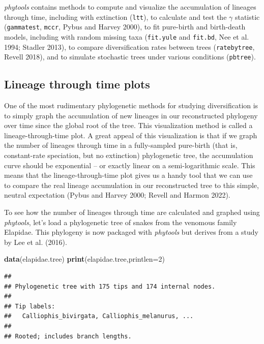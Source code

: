 \documentclass[fleqn,10pt,lineno]{wlpeerj} %
\newenvironment{Shaded}{\begin{snugshade}}{\end{snugshade}}
\newcommand{\AttributeTok}[1]{\textcolor[rgb]{0.13,0.29,0.53}{#1}}
\newcommand{\DecValTok}[1]{\textcolor[rgb]{0.00,0.00,0.81}{#1}}
\newcommand{\FunctionTok}[1]{\textcolor[rgb]{0.13,0.29,0.53}{\textbf{#1}}}
\newcommand{\NormalTok}[1]{#1}
\begin{document}
\emph{phytools} contains methods to compute and visualize the accumulation of lineages through time, including with extinction (\texttt{ltt}), to calculate and test the \(\gamma\) statistic (\texttt{gammatest}, \texttt{mccr}, Pybus and Harvey 2000), to fit pure-birth and birth-death models, including with random missing taxa (\texttt{fit.yule} and \texttt{fit.bd}, Nee et al. 1994; Stadler 2013), to compare diversification rates between trees (\texttt{ratebytree}, Revell 2018), and to simulate stochastic trees under various conditions (\texttt{pbtree}).

\hypertarget{lineage-through-time-plots}{%
\subsection{Lineage through time plots}\label{lineage-through-time-plots}}

One of the most rudimentary phylogenetic methods for studying diversification is to simply graph the accumulation of new lineages in our reconstructed phylogeny over time since the global root of the tree. This visualization method is called a lineage-through-time plot. A great appeal of this visualization is that if we graph the number of lineages through time in a fully-sampled pure-birth (that is, constant-rate speciation, but no extinction) phylogenetic tree, the accumulation curve should be exponential -- or exactly linear on a semi-logarithmic scale. This means that the lineage-through-time plot gives us a handy tool that we can use to compare the real lineage accumulation in our reconstructed tree to this simple, neutral expectation (Pybus and Harvey 2000; Revell and Harmon 2022).

To see how the number of lineages through time are calculated and graphed using \emph{phytools}, let's load a phylogenetic tree of snakes from the venomous family Elapidae. This phylogeny is now packaged with \emph{phytools} but derives from a study by Lee et al. (2016).

\begin{Shaded}
\begin{Highlighting}[]
\FunctionTok{data}\NormalTok{(elapidae.tree)}
\FunctionTok{print}\NormalTok{(elapidae.tree,}\AttributeTok{printlen=}\DecValTok{2}\NormalTok{)}
\end{Highlighting}
\end{Shaded}

\begin{verbatim}
## 
## Phylogenetic tree with 175 tips and 174 internal nodes.
## 
## Tip labels:
##   Calliophis_bivirgata, Calliophis_melanurus, ...
## 
## Rooted; includes branch lengths.
\end{verbatim}
\end{document}
